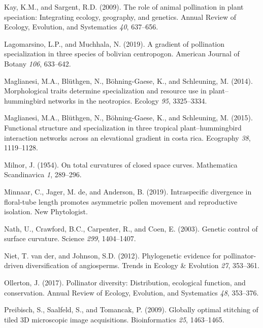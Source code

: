 \documentclass[]{article}
\begin{document}
\leavevmode\hypertarget{ref-kay_2009}{}%
Kay, K.M., and Sargent, R.D. (2009). The role of animal pollination in
plant speciation: Integrating ecology, geography, and genetics. Annual
Review of Ecology, Evolution, and Systematics \emph{40}, 637--656.

\leavevmode\hypertarget{ref-lagomarsino_2019}{}%
Lagomarsino, L.P., and Muchhala, N. (2019). A gradient of pollination
specialization in three species of bolivian centropogon. American
Journal of Botany \emph{106}, 633--642.

\leavevmode\hypertarget{ref-maglianesi_2014}{}%
Maglianesi, M.A., Blüthgen, N., Böhning-Gaese, K., and Schleuning, M.
(2014). Morphological traits determine specialization and resource use
in plant--hummingbird networks in the neotropics. Ecology \emph{95},
3325--3334.

\leavevmode\hypertarget{ref-maglianesi_2015_b}{}%
Maglianesi, M.A., Blüthgen, N., Böhning-Gaese, K., and Schleuning, M.
(2015). Functional structure and specialization in three tropical
plant--hummingbird interaction networks across an elevational gradient
in costa rica. Ecography \emph{38}, 1119--1128.

\leavevmode\hypertarget{ref-milnor_1954}{}%
Milnor, J. (1954). On total curvatures of closed space curves.
Mathematica Scandinavica \emph{1}, 289--296.

\leavevmode\hypertarget{ref-minnaar_2019}{}%
Minnaar, C., Jager, M. de, and Anderson, B. (2019). Intraspecific
divergence in floral-tube length promotes asymmetric pollen movement and
reproductive isolation. New Phytologist.

\leavevmode\hypertarget{ref-nath_2003}{}%
Nath, U., Crawford, B.C., Carpenter, R., and Coen, E. (2003). Genetic
control of surface curvature. Science \emph{299}, 1404--1407.

\leavevmode\hypertarget{ref-vanderniet_2012}{}%
Niet, T. van der, and Johnson, S.D. (2012). Phylogenetic evidence for
pollinator-driven diversification of angiosperms. Trends in Ecology \&
Evolution \emph{27}, 353--361.

\leavevmode\hypertarget{ref-ollerton_2017}{}%
Ollerton, J. (2017). Pollinator diversity: Distribution, ecological
function, and conservation. Annual Review of Ecology, Evolution, and
Systematics \emph{48}, 353--376.

\leavevmode\hypertarget{ref-preibisch_2009}{}%
Preibisch, S., Saalfeld, S., and Tomancak, P. (2009). Globally optimal
stitching of tiled 3D microscopic image acquisitions. Bioinformatics
\emph{25}, 1463--1465.
\end{document}
